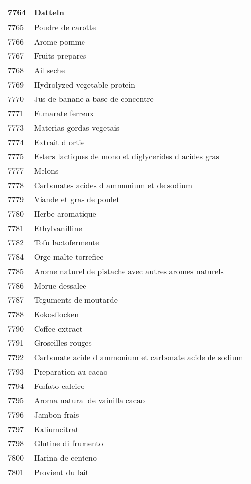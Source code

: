 \begin{longtable}{|l|l|}
7764 & Datteln \\ \hline 
7765 & Poudre de carotte \\ \hline 
7766 & Arome pomme \\ \hline 
7767 & Fruits prepares \\ \hline 
7768 & Ail seche \\ \hline 
7769 & Hydrolyzed vegetable protein \\ \hline 
7770 & Jus de banane a base de concentre \\ \hline 
7771 & Fumarate ferreux \\ \hline 
7773 & Materias gordas vegetais \\ \hline 
7774 & Extrait d ortie \\ \hline 
7775 & Esters lactiques de mono et diglycerides d acides gras \\ \hline 
7777 & Melons \\ \hline 
7778 & Carbonates acides d ammonium et de sodium \\ \hline 
7779 & Viande et gras de poulet \\ \hline 
7780 & Herbe aromatique \\ \hline 
7781 & Ethylvanilline \\ \hline 
7782 & Tofu lactofermente \\ \hline 
7784 & Orge malte torrefiee \\ \hline 
7785 & Arome naturel de pistache avec autres aromes naturels \\ \hline 
7786 & Morue dessalee \\ \hline 
7787 & Teguments de moutarde \\ \hline 
7788 & Kokosflocken \\ \hline 
7790 & Coffee extract \\ \hline 
7791 & Groseilles rouges \\ \hline 
7792 & Carbonate acide d ammonium et carbonate acide de sodium \\ \hline 
7793 & Preparation au cacao \\ \hline 
7794 & Fosfato calcico \\ \hline 
7795 & Aroma natural de vainilla cacao \\ \hline 
7796 & Jambon frais \\ \hline 
7797 & Kaliumcitrat \\ \hline 
7798 & Glutine di frumento \\ \hline 
7800 & Harina de centeno \\ \hline 
7801 & Provient du lait \\ \hline 

\end{longtable}
